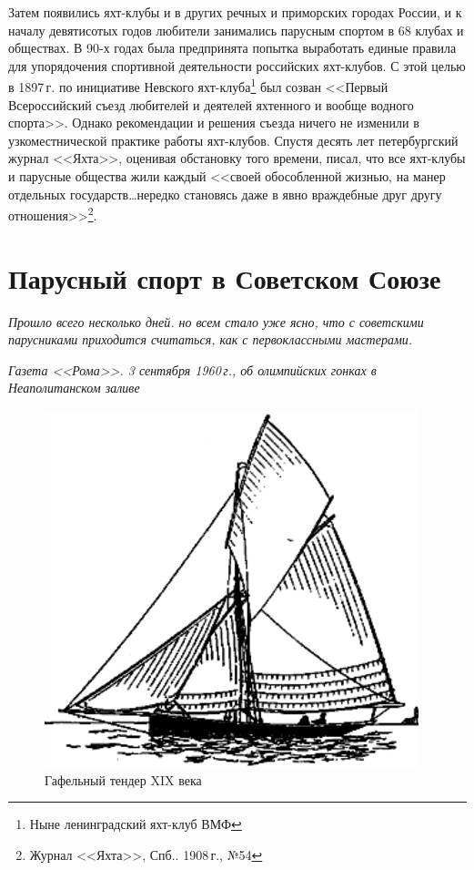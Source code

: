 \documentclass[a4paper, 12pt, twoside, final]{scrbook}
\begin{document}
Затем появились яхт-клубы и в других речных и приморских городах России,
и к началу девятисотых годов любители занимались парусным спортом
в 68 клубах и обществах. В 90-х годах была предпринята попытка выработать
единые правила для упорядочения спортивной деятельности российских
яхт-клубов. С этой целью в 1897\,г. по инициативе Невского яхт-клуба\footnote{Ныне ленинградский яхт-клуб ВМФ}
был созван <<Первый Всероссийский съезд любителей и деятелей яхтенного
и вообще водного спорта>>. Однако рекомендации и решения съезда ничего
не изменили в узкоместнической практике работы яхт-клубов. Спустя
десять лет петербургский журнал <<Яхта>>, оценивая обстановку того времени,
писал, что все яхт-клубы и парусные общества жили каждый <<своей обособленной
жизнью, на манер отдельных государств\ldots нередко становясь даже в
явно враждебные друг другу отношения>>\footnote{Журнал <<Яхта>>, Спб.. 1908\,г., №54}.

\section{Парусный спорт в Советском Союзе}

\epigraph{\emph{Прошло всего несколько дней. но всем стало уже ясно, что с советскими парусниками приходится считаться, как с первоклассными мастерами.}}{\emph{Газета <<Рома>>. 3 сентября 1960\,г., об олимпийских гонках в Неаполитанском заливе}}

\begin{figure}%
\centering\includegraphics{pics/Gafelnyj_tender_konca_XIX_veka}
\caption{Гафельный тендер XIX века}
\end{figure}
\end{document}
